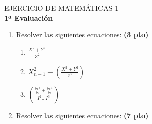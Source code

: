 \documentclass[10pt,a4paper]{article}
\begin{document}
\begin{center}
	\item \textcolor[rgb]{1,0,0}{\LARGE EJERCICIO DE MATEMÁTICAS 1}
	\vspace{2cm} \\
	{\LARGE \bf 1ª Evaluación}
\end{center}
\begin{flushleft}
	\begin{enumerate}
		\item \textcolor[rgb]{0,0,0}{Resolver las siguientes 						ecuaciones:} \textcolor [rgb]{0,0,1}{\bf (3 pto)}
			\begin{enumerate}
				\item $\frac{X^2+Y^2}{Z^2}$
				\item $X^2_{n-1}-(\frac{X^2+Y^2}						{Z^2})$
				\item $(\frac{\frac{bx^3}{b_1}+							{\frac{bx^4}{b_2}}} 								{I^2...I^3})$
			\end{enumerate}
		\item \textcolor[rgb]{0,0,0}{Resolver las siguientes 						ecuaciones:} \textcolor [rgb]{0,0,1}{\bf (7 pto)}
	\end{enumerate}
\end{flushleft}
\end{document}
